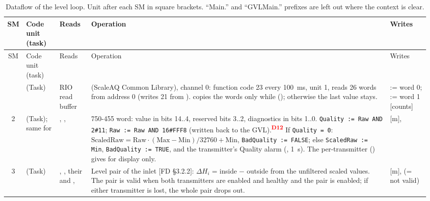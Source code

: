 \documentclass[11pt]{article}
\newcommand{\code}[1]{\texttt{#1}}
\newcommand{\dev}[1]{\textsuperscript{\textcolor{red}{\textbf{D#1}}}}
\begin{document}
\begin{landscape}
\small
\begin{longtable}{@{}cP{33mm}P{48mm}P{80mm}P{50mm}@{}}
\caption{Dataflow of the level loop. Unit after each SM in square brackets. ``Main.'' and
``GVLMain.'' prefixes are left out where the context is clear.}
\label{tab:dataflow}\\
\toprule
SM & Code unit (task) & Reads & Operation & Writes \\
\midrule
\endfirsthead
\toprule
SM & Code unit (task) & Reads & Operation & Writes \\
\midrule
\endhead
\bottomrule
{} &  (Task) &
  RIO read buffer  &
   (ScaleAQ Common Library), channel 0: function code 23 every 100~ms,
  unit 1, reads 26 words from address 0 (writes 21 from ). 
  copies the words only while  (); otherwise the last value stays. &
   := word 0;
   := word 1 [counts] \\
2 &  (Task); same for
   &
  , ,  &
  750-455 word: value in bits 14..4, reserved bits 3..2, diagnostics in bits 1..0.
  \code{Quality := Raw AND 2\#11}; \code{Raw := Raw AND 16\#FFF8} (written back to the GVL).\dev{12}
  If \code{Quality = 0}: $\text{ScaledRaw} = \text{Raw}\cdot(\text{Max}-\text{Min})/32760 +
  \text{Min}$, \code{BadQuality := FALSE}; else \code{ScaledRaw := Min},
  \code{BadQuality := TRUE}, and the transmitter's Quality alarm (,
  1~s). The per-transmitter  () gives  for
  display only. &
   [m],  \\
3 &  (Task) &
  , , their  and
  ,  &
  Level pair of the inlet [FD \S3.2.2]: $\Delta H_i$ = inside $-$ outside from the unfiltered
  scaled values. The pair is valid when both transmitters are enabled and healthy and the pair is
  enabled; if either transmitter is lost, the whole pair drops out. &
   [m],  (= not valid) \\

\end{longtable}
\end{landscape}
\end{document}
